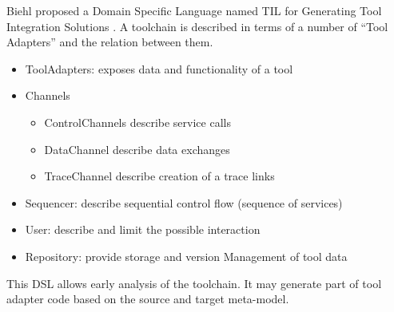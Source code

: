 Biehl proposed a Domain Specific Language named TIL for Generating Tool Integration
Solutions \cite{biehl_matthias_domain_2011}.  A toolchain is described in terms
of a number of ``Tool Adapters'' and the relation between them.
\begin{itemize}
\item ToolAdapters: exposes data and functionality of a tool
\item Channels
  \begin{itemize}
  \item ControlChannels describe service calls
  \item DataChannel describe data exchanges
  \item TraceChannel  describe creation of a trace links
  \end{itemize}

\item Sequencer: describe sequential control flow (sequence of services)
\item User:  describe and limit the possible interaction
\item Repository:  provide storage and version Management of tool data
\end{itemize}
This DSL allows early analysis of the toolchain.
It may generate part of tool adapter code based on the source and target
meta-model.

